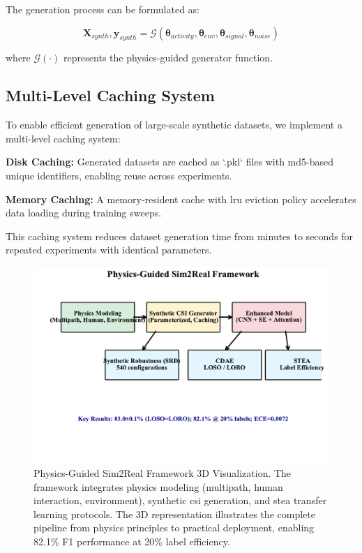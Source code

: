 \documentclass[journal]{IEEEtran}
\begin{document}
The generation process can be formulated as:

\begin{equation}
\mathbf{X}_{synth}, \mathbf{y}_{synth} = \mathcal{G}(\boldsymbol{\theta}_{activity}, \boldsymbol{\theta}_{env}, \boldsymbol{\theta}_{signal}, \boldsymbol{\theta}_{noise})
\end{equation}

where $\mathcal{G}(\cdot)$ represents the physics-guided generator function.

\subsection{Multi-Level Caching System}

To enable efficient generation of large-scale synthetic datasets, we implement a multi-level caching system:

\textbf{Disk Caching:} Generated datasets are cached as `.pkl` files with \gls{md5}-based unique identifiers, enabling reuse across experiments.

\textbf{Memory Caching:} A memory-resident cache with \gls{lru} eviction policy accelerates data loading during training sweeps.

This caching system reduces dataset generation time from minutes to seconds for repeated experiments with identical parameters.

\begin{figure}[ht]
\centering
\includegraphics[width=\columnwidth]{figures/figure2_physics-guided.pdf}
\caption{Physics-Guided Sim2Real Framework 3D Visualization. The framework integrates physics modeling (multipath, human interaction, environment), synthetic \gls{csi} generation, and \gls{stea} transfer learning protocols. The 3D representation illustrates the complete pipeline from physics principles to practical deployment, enabling 82.1\% F1 performance at 20\% label efficiency.}
\label{fig:physics_3d_framework}
\end{figure}
\end{document}
